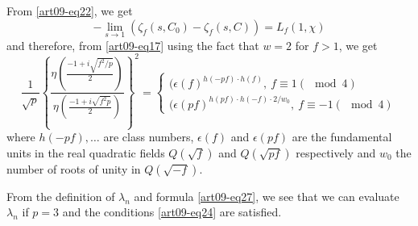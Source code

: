From \eqref{art09-eq22}, we get
$$
-\lim\limits_{s\to 1}(\zeta_{f}(s,C_{0})-\zeta_{f}(s,C))=L_{f}(1,\chi)
$$
and therefore, from \eqref{art09-eq17} using the fact that $w=2$ for $f>1$, we get 
$$
\frac{1}{\sqrt{p}}\left\{\frac{\eta\left(\frac{-1+i\sqrt{f^{2}/p}}{2}\right)}{\eta\left(\frac{-1+i\sqrt{f^{2}p}}{2}\right)}\right\}^{2}=
\begin{cases}
(\epsilon(f)^{h(-pf)\cdot h(f)}, \ f\equiv 1(\mod 4)\\[3pt]
(\epsilon(pf)^{h(pf)\cdot h(-f)\cdot 2/w_{0}}, \ f\equiv -1(\mod 4)
\end{cases}
$$
where $h(-pf),\ldots$ are class numbers, $\epsilon(f)$ and $\epsilon(pf)$ are the fundamental units in the real quadratic fields $Q(\sqrt{f})$ and $Q(\sqrt{pf})$ respectively and $w_{0}$ the number of roots of unity in $Q(\sqrt{-f})$.

From the definition of $\lambda_{n}$ and formula \eqref{art09-eq27}, we see that we can evaluate $\lambda_{n}$ if $p=3$ and the conditions \eqref{art09-eq24} are satisfied.

